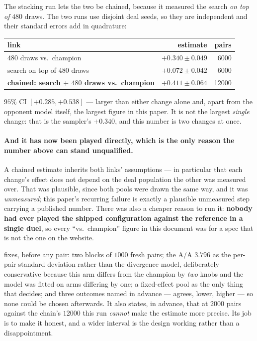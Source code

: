\documentclass[11pt,a4paper]{article}
\begin{document}
The stacking run lets the two be chained, because it measured the search
\emph{on top of} $480$ draws. The two runs use disjoint deal seeds, so they are
independent and their standard errors add in quadrature:
\begin{center}
\begin{tabular}{lrr}
\toprule
link & estimate & pairs \\
\midrule
$480$ draws vs.\ champion & $+0.340 \pm 0.049$ & 6000 \\
search on top of $480$ draws & $+0.072 \pm 0.042$ & 6000 \\
\midrule
\textbf{chained: search $+$ $480$ draws vs.\ champion}
  & $\mathbf{+0.411 \pm 0.064}$ & 12000 \\
\bottomrule
\end{tabular}
\end{center}
$95\%$ CI $[+0.285, +0.538]$ --- larger than either change alone and, apart
from the opponent model itself, the largest figure in this paper. It is not the
largest \emph{single} change: that is the sampler's $+0.340$, and this number is
two changes at once.

\paragraph{And it has now been played directly, which is the only reason the
number above can stand unqualified.} A chained estimate inherits both links'
assumptions --- in particular that each change's effect does not depend on the
deal population the other was measured over. That was plausible, since both
pools were drawn the same way, and it was \emph{unmeasured}; this paper's
recurring failure is exactly a plausible unmeasured step carrying a published
number. There was also a cheaper reason to run it: \textbf{nobody had ever
played the shipped configuration against the reference in a single duel}, so
every ``vs.\ champion'' figure in this document was for a spec that is not the
one on the website.

 fixes, before any pair: two blocks
of $1000$ fresh pairs; the A/A $3.796$ as the per-pair standard deviation
rather than the divergence model, deliberately conservative because this arm
differs from the champion by \emph{two} knobs and the model was fitted on arms
differing by one; a fixed-effect pool as the only thing that decides; and three
outcomes named in advance --- agrees, lower, higher --- so none could be chosen
afterwards. It also states, in advance, that at $2000$ pairs against the
chain's $12000$ this run \emph{cannot} make the estimate more precise. Its job
is to make it honest, and a wider interval is the design working rather than a
disappointment.
\end{document}
